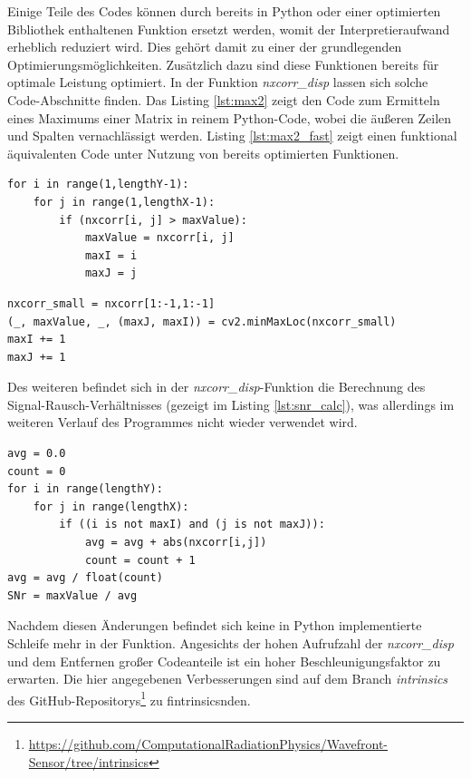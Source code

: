 Einige Teile des Codes können durch bereits in Python oder einer optimierten Bibliothek enthaltenen Funktion ersetzt werden, womit der Interpretieraufwand erheblich reduziert wird. Dies gehört damit zu einer der grundlegenden Optimierungsmöglichkeiten. Zusätzlich dazu sind diese Funktionen bereits für optimale Leistung optimiert. In der Funktion \textit{nxcorr\_disp} lassen sich solche Code-Abschnitte finden. Das Listing \ref{lst:max2} zeigt den Code zum Ermitteln eines Maximums einer Matrix in reinem Python-Code, wobei die äußeren Zeilen und Spalten vernachlässigt werden. Listing \ref{lst:max2_fast} zeigt einen funktional äquivalenten Code unter Nutzung von bereits optimierten Funktionen. 

\begin{lstlisting}[caption={Finden des Maximums einer Matrix}, label={lst:max2}]
for i in range(1,lengthY-1):
	for j in range(1,lengthX-1):
		if (nxcorr[i, j] > maxValue):
			maxValue = nxcorr[i, j]
			maxI = i
			maxJ = j
\end{lstlisting}

\begin{lstlisting}[caption={Finden des Maximums einer Matrix mittels NumPy und OpenCV}, label={lst:max2_fast}]
nxcorr_small = nxcorr[1:-1,1:-1]
(_, maxValue, _, (maxJ, maxI)) = cv2.minMaxLoc(nxcorr_small)
maxI += 1
maxJ += 1
\end{lstlisting}

Des weiteren befindet sich in der \textit{nxcorr\_disp}-Funktion die Berechnung des Signal-Rausch-Verhältnisses (gezeigt im Listing \ref{lst:snr_calc}), was allerdings im weiteren Verlauf des Programmes nicht wieder verwendet wird. 

\begin{lstlisting}[caption={Berechnung des Signal-Rausch-Verhältnisses}, label={lst:snr_calc}]
avg = 0.0
count = 0
for i in range(lengthY):
	for j in range(lengthX):
		if ((i is not maxI) and (j is not maxJ)):
			avg = avg + abs(nxcorr[i,j])
			count = count + 1
avg = avg / float(count)
SNr = maxValue / avg
\end{lstlisting}

Nachdem diesen Änderungen befindet sich keine in Python implementierte Schleife mehr in der Funktion. Angesichts der hohen Aufrufzahl der \textit{nxcorr\_disp} und dem Entfernen großer Codeanteile ist ein hoher Beschleunigungsfaktor zu erwarten. Die hier angegebenen Verbesserungen sind auf dem Branch \textit{intrinsics} des GitHub-Repositorys\footnote{\url{https://github.com/ComputationalRadiationPhysics/Wavefront-Sensor/tree/intrinsics}} zu fintrinsicsnden. 

